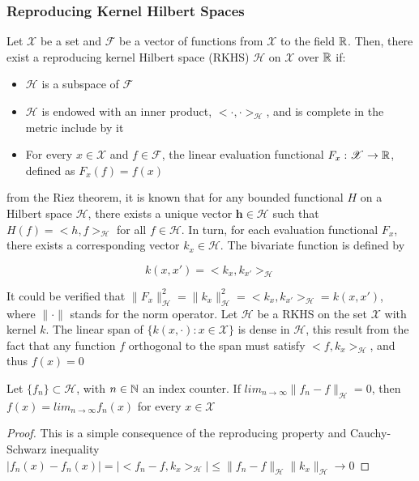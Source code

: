 \subsubsection{Reproducing Kernel Hilbert Spaces}

Let $\mathscr{X}$ be a set and $\mathscr{F}$ be a vector of functions from $\mathscr{X}$ to the field $\mathbb{R}$. Then, there exist a reproducing kernel Hilbert space (RKHS) $\mathscr{H}$ on $\mathscr{X}$ over $\mathbb{R}$ if:
\begin{itemize}
    \item $\mathscr{H}$ is a subspace of $\mathscr{F}$
    \item $\mathscr{H}$ is endowed with an inner product, $<\cdot,\cdot>_{\mathscr{H}}$, and is complete in the metric include by it
    \item For every $x \in \mathscr{X}$ and $f \in \mathscr{F}$, the linear evaluation functional $F_x:\mathscr{X} \rightarrow \mathbb{R}$, defined as $F_x(f) = f(x)$
\end{itemize}

from the Riez theorem, it is known that for any bounded functional $H$ on a Hilbert space $\mathscr{H}$, there exists a unique vector $\mathbf{h} \in \mathscr{H}$ such that $H(f) = <h,f>_{\mathscr{H}}$ for all $f \in \mathscr{H}$. In turn, for each evaluation functional $F_x$, there exists a corresponding vector $k_x \in \mathscr{H}$. The bivariate function is defined by

\begin{equation}
    k(x,x') = <k_x,k_{x'}>_{\mathscr{H}}
\end{equation}

It could be verified that $\|F_x\|_{\mathscr{H}}^2 = \|k_x\|_{\mathscr{H}}^2 = <k_x,k_{x'}>_{\mathscr{H}} =k(x,x')$, where $\|\cdot\|$ stands for the norm operator. Let $\mathscr{H}$ be a RKHS on the set $\mathscr{X}$ with kernel $k$. The linear span of $\{k(x,\cdot):x\in \mathscr{X} \}$ is dense in $\mathscr{H}$, this result from the fact that any function $f$ orthogonal to the span must satisfy $<f,k_x>_{\mathscr{H}}$, and thus $f(x)=0$

\begin{lemm}
    Let $\{f_n\} \subset \mathscr{H}$, with $n \in \mathbb{N}$ an index counter. If $lim_{n \rightarrow \infty} \|f_n-f\|_\mathscr{H}=0$, then $f(x)=lim_{n \rightarrow \infty} f_n(x)$ for every $x \in \mathscr{X}$
\end{lemm}

\begin{proof}
This is a simple consequence of the reproducing property and Cauchy-Schwarz inequality $|f_n(x)-f_n(x)| = |<f_n-f,k_x>_{\mathscr{H}}| \leq \|f_n-f\|_{\mathscr{H}}\|k_x\|_{\mathscr{H}} \rightarrow 0$
\end{proof}

